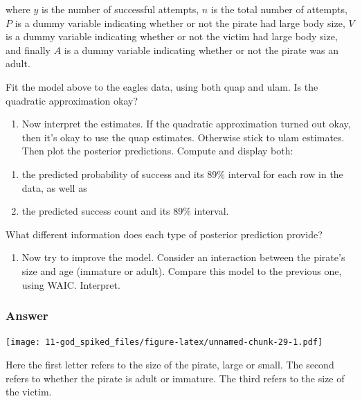 \documentclass[
]{book}
\providecommand{\tightlist}{%
  \setlength{\itemsep}{0pt}\setlength{\parskip}{0pt}}
\begin{document}
where \(y\) is the number of successful attempts, \(n\) is the total number of attempts, \(P\) is a dummy variable indicating whether or not the pirate had large body size, \(V\) is a dummy variable indicating whether or not the victim had large body size, and finally \(A\) is a dummy variable indicating whether or not the pirate was an adult.

Fit the model above to the eagles data, using both quap and ulam. Is the quadratic approximation okay?

\begin{enumerate}
\def\labelenumi{(\alph{enumi})}
\setcounter{enumi}{1}
\tightlist
\item
  Now interpret the estimates. If the quadratic approximation turned out okay, then it's okay to use the quap estimates. Otherwise stick to ulam estimates. Then plot the posterior predictions. Compute and display both:
\end{enumerate}

\begin{enumerate}
\def\labelenumi{\arabic{enumi}.}
\item
  the predicted probability of success and its 89\% interval for each row in the data, as well as
\item
  the predicted success count and its 89\% interval.
\end{enumerate}

What different information does each type of posterior prediction provide?

\begin{enumerate}
\def\labelenumi{(\alph{enumi})}
\setcounter{enumi}{2}
\tightlist
\item
  Now try to improve the model. Consider an interaction between the pirate's size and age (immature or adult). Compare this model to the previous one, using WAIC. Interpret.
\end{enumerate}

\hypertarget{answer-94}{%
\subsubsection*{Answer}\label{answer-94}}

\texttt{[image: 11-god\_spiked\_files/figure-latex/unnamed-chunk-29-1.pdf]}

Here the first letter refers to the size of the pirate, large or small. The second refers to whether the pirate is adult or immature. The third refers to the size of the victim.
\end{document}
